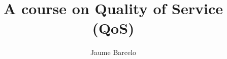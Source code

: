 \documentclass[12pt]{book}
\begin{document}
\frontmatter
\pagestyle{empty}
\title{\textbf{A course on Quality of Service (QoS)}}
\author{Jaume Barcelo}
\maketitle
%
\pagestyle{fancy}
%
\tableofcontents
%
\mainmatter
%


\begin{appendices}
\appendixpage
\noappendicestocpagenum
\addappheadtotoc


\end{appendices}
\backmatter
%


\end{document}
